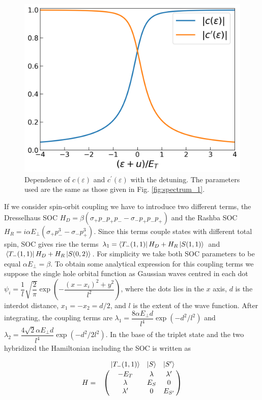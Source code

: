 \documentclass[aip,rsi,amsmath,amssymb,reprint, english]{revtex4-1}
\begin{document}
\begin{figure}[h!]
	\centering
	\includegraphics[width=.8\linewidth]{coefficients}
	\caption{Dependence of $c(\varepsilon)$ and $c^{\prime}(\varepsilon)$ with the detuning. The parameters used are the same as those given in Fig. \ref{fig:spectrum_1}.}
	\label{fig:coefficients}
\end{figure}

If we consider spin-orbit coupling we have to introduce two different terms, the Dresselhaus SOC $H_D=\beta(\sigma_+p_-p_+p_--\sigma_-p_+p_-p_+)$ and the Rashba SOC $H_R=i\alpha E_{\perp}(\sigma_+p_-^3-\sigma_-p_+^3)$. Since this terms couple states with different total spin, SOC gives rise the terms $\lambda_1=\bra{T_-(1,1)}H_D+H_R\ket{S(1,1)}$ and $\bra{T_-(1,1)}H_D+H_R\ket{S(0,2)}$. For simplicity we take both SOC parameters to be equal $\alpha E_{\perp}=\beta$. To obtain some analytical expression for this coupling terms we suppose the single hole orbital function as Gaussian waves centred in each dot $\psi_i=\dfrac{1}{l}\sqrt{\dfrac{2}{\pi}}\exp(-\dfrac{(x-x_i)^2+y^2}{l^2})$, where the dots lies in the $x$ axis, $d$ is the interdot distance, $x_1=-x_2=d/2$, and $l$ is the extent of the wave function. After integrating, the coupling terms are $\lambda_1=\dfrac{8\alpha E_{\perp}d}{l^4}\exp(-d^2/l^2)$ and $\lambda_2=\dfrac{4\sqrt{2}\alpha E_{\perp}d}{l^4}\exp(-d^2/2l^2)$. In the base of the triplet state and the two hybridized the Hamiltonian including the SOC is written as

\begin{equation}
	H=\bordermatrix{~ & \ket{T_-(1,1)} & \ket{S} & \ket{S^{\prime}}\cr
		~ & -E_T & \lambda & \lambda^{\prime} \cr
		~ & \lambda & E_S & 0 \cr
		~ & \lambda^{\prime} & 0 & E_{S^{\prime}} \cr}
\end{equation}
\end{document}

